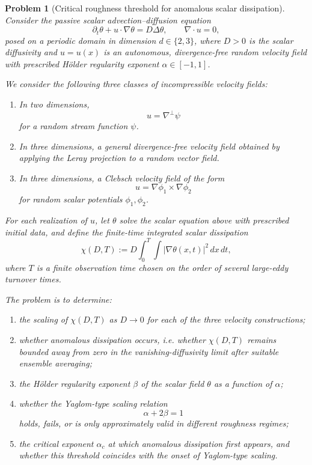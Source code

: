 \usepackage{amsmath,amssymb,amsthm}
\newtheorem{problem}{Problem}

\begin{problem}[Critical roughness threshold for anomalous scalar dissipation]
Consider the passive scalar advection--diffusion equation
\begin{equation}
\partial_t \theta + u\cdot \nabla \theta = D \Delta \theta,
\qquad \nabla \cdot u = 0,
\end{equation}
posed on a periodic domain in dimension $d\in\{2,3\}$, where $D>0$ is the scalar diffusivity and $u=u(x)$ is an autonomous, divergence-free random velocity field with prescribed H\"older regularity exponent $\alpha\in[-1,1]$.

We consider the following three classes of incompressible velocity fields:
\begin{enumerate}
    \item In two dimensions,
    \[
    u = \nabla^\perp \psi
    \]
    for a random stream function $\psi$.

    \item In three dimensions, a general divergence-free velocity field obtained by applying the Leray projection to a random vector field.

    \item In three dimensions, a Clebsch velocity field of the form
    \[
    u = \nabla \phi_1 \times \nabla \phi_2
    \]
    for random scalar potentials $\phi_1,\phi_2$.
\end{enumerate}

For each realization of $u$, let $\theta$ solve the scalar equation above with prescribed initial data, and define the finite-time integrated scalar dissipation
\begin{equation}
\chi(D,T)
:=
D \int_0^T \int |\nabla \theta(x,t)|^2 \, dx\,dt,
\end{equation}
where $T$ is a finite observation time chosen on the order of several large-eddy turnover times.

The problem is to determine:
\begin{enumerate}
    \item the scaling of $\chi(D,T)$ as $D\to 0$ for each of the three velocity constructions;
    \item whether anomalous dissipation occurs, i.e. whether $\chi(D,T)$ remains bounded away from zero in the vanishing-diffusivity limit after suitable ensemble averaging;
    \item the H\"older regularity exponent $\beta$ of the scalar field $\theta$ as a function of $\alpha$;
    \item whether the Yaglom-type scaling relation
    \[
    \alpha + 2\beta = 1
    \]
    holds, fails, or is only approximately valid in different roughness regimes;
    \item the critical exponent $\alpha_c$ at which anomalous dissipation first appears, and whether this threshold coincides with the onset of Yaglom-type scaling.
\end{enumerate}


\end{problem}
